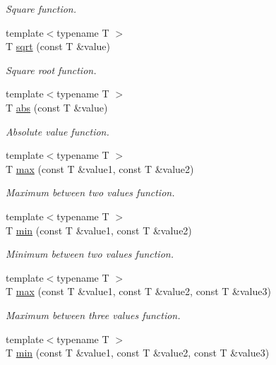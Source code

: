\begin{DoxyCompactItemize}
\begin{DoxyCompactList}\small\item\em Square function. \end{DoxyCompactList}\item 
{\footnotesize template$<$typename T $>$ }\\T \hyperlink{namespaceacme_a6727bc4e9b202cb40e59065a01d9368b}{sqrt} (const T \&value)
\begin{DoxyCompactList}\small\item\em Square root function. \end{DoxyCompactList}\item 
{\footnotesize template$<$typename T $>$ }\\T \hyperlink{namespaceacme_add7b88267b101300f6818a0ed6dacf2a}{abs} (const T \&value)
\begin{DoxyCompactList}\small\item\em Absolute value function. \end{DoxyCompactList}\item 
{\footnotesize template$<$typename T $>$ }\\T \hyperlink{namespaceacme_abc0dd1e2a5441a08af324075636ea74a}{max} (const T \&value1, const T \&value2)
\begin{DoxyCompactList}\small\item\em Maximum between two values function. \end{DoxyCompactList}\item 
{\footnotesize template$<$typename T $>$ }\\T \hyperlink{namespaceacme_a8e3d214c67f792ca4deef35481ea8b12}{min} (const T \&value1, const T \&value2)
\begin{DoxyCompactList}\small\item\em Minimum between two values function. \end{DoxyCompactList}\item 
{\footnotesize template$<$typename T $>$ }\\T \hyperlink{namespaceacme_aca4726ee714290f5715f97242fd61cea}{max} (const T \&value1, const T \&value2, const T \&value3)
\begin{DoxyCompactList}\small\item\em Maximum between three values function. \end{DoxyCompactList}\item 
{\footnotesize template$<$typename T $>$ }\\T \hyperlink{namespaceacme_a49c47fe19dcb5a41cdb8111446c6f51e}{min} (const T \&value1, const T \&value2, const T \&value3)

\end{DoxyCompactItemize}
